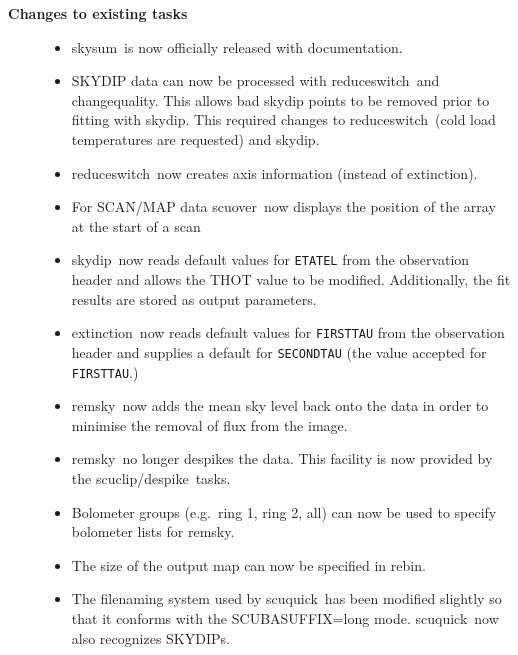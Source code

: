 \documentclass[twoside,11pt]{article}
\newcommand{\task}[1]{{\sf #1}}
\newcommand{\param}[1]{{\tt #1}}
\newcommand{\rebin}{\htmlref{\task{rebin}}{REBIN}}
\newcommand{\chgqual}{\htmlref{\task{change\_quality}}{CHANGE_QUALITY}}
\newcommand{\resw}{\htmlref{\task{reduce\_switch}}{REDUCE_SWITCH}}
\newcommand{\skydip}{\htmlref{\task{skydip}}{SKYDIP}}
\newcommand{\ext}{\htmlref{\task{extinction}}{EXTINCTION}}
\newcommand{\scuquick}{\htmlref{\task{scuquick}}{SCUQUICK}}
\newcommand{\remsky}{\htmlref{\task{remsky}}{REMSKY}}
\newcommand{\scuover}{\htmlref{\task{scuover}}{SCUOVER}}
\newcommand{\skysum}{\htmlref{\task{skysum}}{SKYSUM}}
\newcommand{\despike}{\htmlref{\task{despike}}{DESPIKE}}
\newcommand{\scuclip}{\htmlref{\task{scuclip}}{SCUCLIP}}
\newcommand{\htmlref}[2]{#1}
\renewcommand{\_}{\texttt{\symbol{95}}}
\begin{document}
\begin{description}
\begin{itemize}
\end{itemize}


\item[\textbf{Changes to existing tasks}] \mbox{}

\begin{itemize}
\item \skysum\ is now officially released with documentation.

\item SKYDIP data can now be processed with \resw\ and \chgqual.
This allows bad skydip points to be removed prior to fitting with \skydip.
This required changes to \resw\ (cold load temperatures are requested)
and \skydip.

\item \resw\ now creates axis information (instead of \ext).

\item For SCAN/MAP data \scuover\ now displays the position of the array at the
start of a scan 

\item \skydip\ now reads default values for \param{ETA\_TEL} from the observation 
header and allows the T\_HOT value to be modified. Additionally, the fit
results are stored as output parameters.

\item \ext\ now reads default values for \param{FIRST\_TAU} from the
observation header and supplies a default for \param{SECOND\_TAU} (the value
accepted for \param{FIRST\_TAU}.)

\item \remsky\ now adds the mean sky level back onto the data in order to
minimise the removal of flux from the image.

\item \remsky\ no longer despikes the data. This facility is now provided by
the  \scuclip/\despike\ tasks.

\item Bolometer groups (e.g.\ ring 1, ring 2, all) can now be used to specify
bolometer lists for \remsky.

\item The size of the output map can now be specified in \rebin.

\item The filenaming system used by \scuquick\ has been modified slightly so
that it conforms with the SCUBA\_SUFFIX=long mode. \scuquick\ now also
recognizes SKYDIPs. 

\end{itemize}

\end{description}
\end{document}
